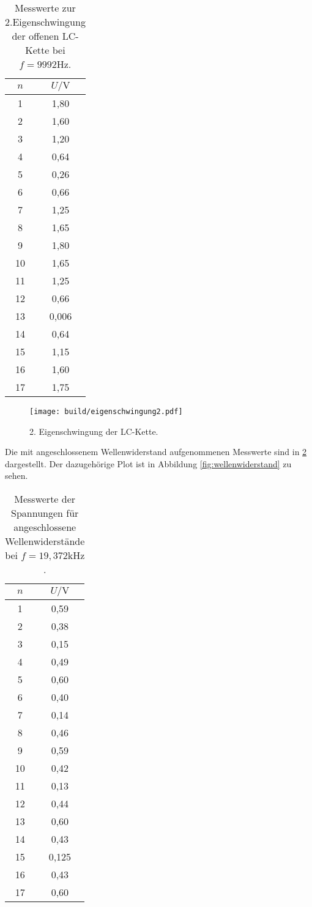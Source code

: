 \begin{table}
  \centering
  \caption{Messwerte zur 2.Eigenschwingung der offenen LC-Kette bei $f = 9992 \si{\Hz}$.}
  \label{tab:eigenschwingung2}
  \begin{tabular}{c c}
    \toprule
    $n$ & $U / \si{\volt}$ \\
\midrule
1 & 1,80 \\
2 & 1,60 \\
3 & 1,20 \\
4 & 0,64 \\
5 & 0,26 \\
6 & 0,66 \\
7 & 1,25 \\
8 & 1,65 \\
9 & 1,80 \\
10 & 1,65 \\
11 & 1,25 \\
12 & 0,66 \\
13 & 0,006 \\
14 & 0,64 \\
15 & 1,15 \\
16 & 1,60 \\
17 & 1,75 \\
\bottomrule
\end{tabular}
\end{table}

\begin{figure}
  \centering
  \texttt{[image: build/eigenschwingung2.pdf]}
\caption{2. Eigenschwingung der LC-Kette.}
  \label{fig:eigenschwingung2}
\end{figure}

Die mit angeschlossenem Wellenwiderstand aufgenommenen Messwerte sind in \ref{tab:wellenwiderstand} dargestellt. Der dazugehörige Plot ist in Abbildung \ref{fig:wellenwiderstand} zu sehen.
\begin{table}
  \centering
  \caption{Messwerte der Spannungen für angeschlossene Wellenwiderstände bei $f = 19,372 \si{\kilo \Hz}$.}
  \label{tab:wellenwiderstand}
  \begin{tabular}{c c}
    \toprule
    $n$ & $U / \si{\volt}$\\
    \midrule
1 & 0,59 \\
2 & 0,38 \\
3 & 0,15 \\
4 & 0,49 \\
5 & 0,60 \\
6 & 0,40 \\
7 & 0,14 \\
8 & 0,46 \\
9 & 0,59 \\
10 & 0,42 \\
11 & 0,13 \\
12 & 0,44 \\
13 & 0,60 \\
14 & 0,43 \\
15 & 0,125 \\
16 & 0,43 \\
17 & 0,60 \\
\bottomrule
\end{tabular}
\end{table}

